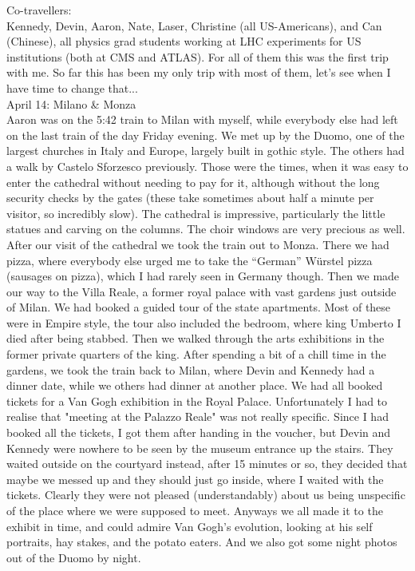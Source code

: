 Co-travellers:\\
Kennedy, Devin, Aaron, Nate, Laser, Christine (all US-Americans), and Can (Chinese), all physics grad students working at LHC experiments for US institutions (both at CMS and ATLAS). For all of them this was the first trip with me. So far this has been my only trip with most of them, let's see when I have time to change that...\\

April 14: Milano \& Monza\\
Aaron was on the 5:42 train to Milan with myself, while everybody else had left on the last train of the day Friday evening. We met up by the Duomo, one of the largest churches in Italy and Europe, largely built in gothic style. The others had a walk by Castelo Sforzesco previously. Those were the times, when it was easy to enter the cathedral without needing to pay for it, although without the long security checks by the gates (these take sometimes about half a minute per visitor, so incredibly slow). The cathedral is impressive, particularly the little statues and carving on the columns. The choir windows are very precious as well. After our visit of the cathedral we took the train out to Monza. There we had pizza, where everybody else urged me to take the ``German'' W\"urstel pizza (sausages on pizza), which I had rarely seen in Germany though. Then we made our way to the Villa Reale, a former royal palace with vast gardens just outside of Milan. We had booked a guided tour of the state apartments. Most of these were in Empire style, the tour also included the bedroom, where king Umberto I died after being stabbed. Then we walked through the arts exhibitions in the former private quarters of the king. After spending a bit of a chill time in the gardens, we took the train back to Milan, where Devin and Kennedy had a dinner date, while we others had dinner at another place. We had all booked tickets for a Van Gogh exhibition in the Royal Palace. Unfortunately I had to realise that "meeting at the Palazzo Reale" was not really specific. Since I had booked all the tickets, I got them after handing in the voucher, but Devin and Kennedy were nowhere to be seen by the museum entrance up the stairs. They waited outside on the courtyard instead, after 15 minutes or so, they decided that maybe we messed up and they should just go inside, where I waited with the tickets. Clearly they were not pleased (understandably) about us being unspecific of the place where we were supposed to meet. Anyways we all made it to the exhibit in time, and could admire Van Gogh's evolution, looking at his self portraits, hay stakes, and the potato eaters. And we also got some night photos out of the Duomo by night.\\

